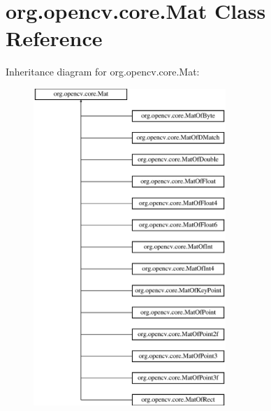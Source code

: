 \hypertarget{classorg_1_1opencv_1_1core_1_1_mat}{}\section{org.\+opencv.\+core.\+Mat Class Reference}
\label{classorg_1_1opencv_1_1core_1_1_mat}
Inheritance diagram for org.\+opencv.\+core.\+Mat\+:\begin{figure}[H]
\begin{center}
\leavevmode
\includegraphics[height=12.000000cm]{classorg_1_1opencv_1_1core_1_1_mat}
\end{center}
\end{figure}
